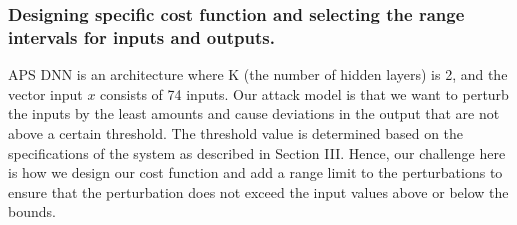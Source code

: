\subsubsection*{Designing \attack specific cost function and selecting the range intervals for inputs and outputs. }
APS DNN is an architecture where K (the number of hidden layers) is 2, and the vector input $x$ consists of 74 inputs. Our attack model is that we want to perturb the inputs by the least amounts and cause deviations in the output that are not above a certain threshold. The threshold value is determined based on the specifications of the system as described in Section III. 
Hence, our challenge here is how we design our cost function and add a range limit to the perturbations to ensure that the perturbation does not exceed the input values above or below the bounds. 

